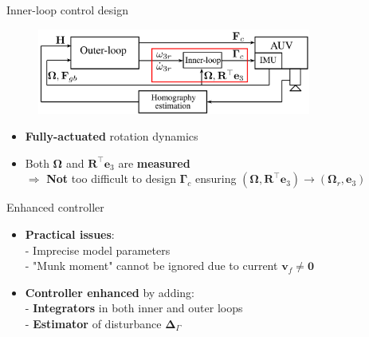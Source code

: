 \documentclass{beamer}
\begin{document}
\begin{frame}{Inner-loop control design}
	
	\begin{figure}
		\includegraphics[width=90mm]{Images/Block_diagram_2_inner.png}
	\end{figure}
	
	\begin{itemize}
		\item \textbf{Fully-actuated} rotation dynamics
		\item Both $\mathbf{\Omega}$ and $\mathbf{R}^\top \mathbf{e}_3$ are \textbf{measured} \\
		$\Rightarrow$ {\color{red} \textbf{Not}} too difficult to design $\mathbf{\Gamma}_c$ ensuring $(\mathbf{\Omega}, \mathbf{R}^\top \mathbf{e}_3) \rightarrow (\mathbf{\Omega}_r, \mathbf{e}_3)$ 
	\end{itemize}
\end{frame}

\begin{frame}{Enhanced controller}

	\begin{itemize}
		\item \textbf{Practical issues}: \\
		- Imprecise model parameters\\
		- "Munk moment" cannot be ignored due to current $\mathbf{v}_f \neq \mathbf{0}$
		\vspace{0.5cm}
		\item \textbf{Controller enhanced} by adding:\\
		- \textbf{\color{red} Integrators} in both inner and outer loops\\
		- \textbf{\color{red} Estimator} of disturbance $\mathbf{\Delta}_{\Gamma}$		
	\end{itemize}
 
\end{frame}
\end{document}
